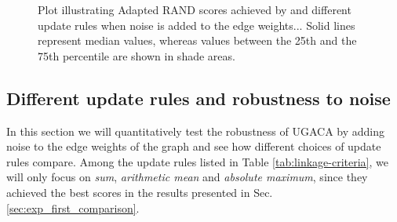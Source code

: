 \begin{figure}
\caption{Plot illustrating Adapted RAND scores achieved by \algname{} and different update rules when noise is added to the edge weights... Solid lines represent median values, whereas values between the 25th and the 75th percentile are shown in shade areas.    }\label{fig:noise_plots}
\end{figure}





\subsection{Different update rules and robustness to noise}
 In this section we will quantitatively test the robustness of UGACA by adding noise to the edge weights of the graph and see how different choices of update rules compare.
 Among the update rules listed in Table \ref{tab:linkage-criteria}, we will only focus on \emph{sum}, \emph{arithmetic mean} and \emph{absolute maximum}, since they achieved the best scores in the results presented in Sec. \ref{sec:exp_first_comparison}. %

